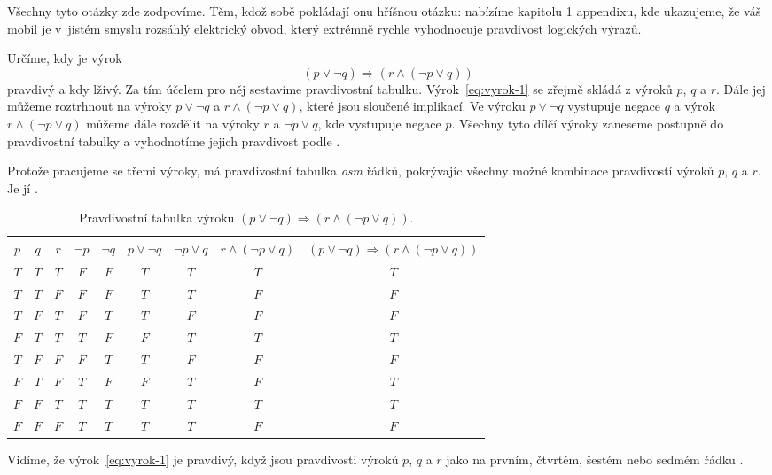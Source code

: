 Všechny tyto otázky zde zodpovíme. Těm, kdož sobě pokládají onu hříšnou otázku:
 nabízíme kapitolu 1 appendixu, kde ukazujeme, že váš mobil
je v~jistém smyslu rozsáhlý elektrický obvod, který extrémně rychle vyhodnocuje
pravdivost logických výrazů.

\begin{example}
  \label{exam:pravdivostni-tabulka-1}
  Určíme, kdy je výrok
  \begin{equation}
    \label{eq:vyrok-1}
    (p \vee \neg q) \Rightarrow (r \wedge (\neg p \vee q))
  \end{equation}
  pravdivý a kdy lživý. Za tím účelem pro něj sestavíme pravdivostní tabulku.
  Výrok~\eqref{eq:vyrok-1} se zřejmě skládá z výroků $p$, $q$ a $r$. Dále jej
  můžeme roztrhnout na výroky $p \vee \neg q$ a $r \wedge (\neg p \vee q)$,
  které jsou sloučené implikací. Ve výroku $p \vee \neg q$ vystupuje negace $q$
  a výrok $r \wedge (\neg p \vee q)$ můžeme dále rozdělit na výroky $r$ a $\neg
  p \vee q$, kde vystupuje negace $p$. Všechny tyto dílčí výroky zaneseme
  postupně do pravdivostní tabulky a vyhodnotíme jejich pravdivost podle
  .

  Protože pracujeme se třemi výroky, má pravdivostní tabulka \emph{osm} řádků,
  pokrývajíc všechny možné kombinace pravdivostí výroků $p$, $q$ a $r$. Je jí
  .

  \begin{table}[ht]
    \centering
    \begin{tabular}{ccc|cccccc}
      $p$ & $q$ & $r$ & $\neg p$ & $\neg q$ & $p \vee \neg q$ & $\neg p \vee q$
      & $r \wedge (\neg p \vee q)$ & $(p \vee \neg q) \Rightarrow (r \wedge
      (\neg p \vee q))$\\[3pt]
      \toprule
      $T$ & $T$ & $T$ & $F$ & $F$ & $T$ & $T$ & $T$ & $T$\\
      $T$ & $T$ & $F$ & $F$ & $F$ & $T$ & $T$ & $F$ & $F$\\
      $T$ & $F$ & $T$ & $F$ & $T$ & $T$ & $F$ & $F$ & $F$\\
      $F$ & $T$ & $T$ & $T$ & $F$ & $F$ & $T$ & $T$ & $T$\\
      $T$ & $F$ & $F$ & $F$ & $T$ & $T$ & $F$ & $F$ & $F$\\
      $F$ & $T$ & $F$ & $T$ & $F$ & $F$ & $T$ & $F$ & $T$\\
      $F$ & $F$ & $T$ & $T$ & $T$ & $T$ & $T$ & $T$ & $T$\\
      $F$ & $F$ & $F$ & $T$ & $T$ & $T$ & $T$ & $F$ & $F$\\
      \bottomrule
    \end{tabular}
    \caption{Pravdivostní tabulka výroku $(p \vee \neg q) \Rightarrow (r \wedge
    (\neg p \vee q))$.}
    \label{table:pravdivostni-tabulka-1}
  \end{table}

  Vidíme, že výrok~\eqref{eq:vyrok-1} je pravdivý, když jsou pravdivosti výroků
  $p$, $q$ a $r$ jako na prvním, čtvrtém, šestém nebo sedmém řádku
  .
\end{example}
